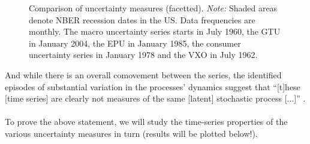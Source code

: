 \documentclass[a4paper,12pt,oneside,pointednumbers,bibtotoc,bigheadings,liststotoc]{scrbook}
\begin{document}
\begin{landscape}
\begin{figure}[!t]
   \centering
   \setlength\fboxsep{0pt}
   \setlength\fboxrule{0pt}
      \caption[Comparison of uncertainty measures (combined).]{Comparison of uncertainty measures (facetted).
      \textit{Note:} Shaded areas denote NBER recession dates in the US. Data frequencies are monthly. The macro uncertainty series starts in July 1960, the GTU in January 2004, the EPU in January 1985, the consumer uncertainty series in January 1978  and the VXO in July 1962.}   \label{fig:comparison_plot_combined}
\end{figure}
\end{landscape}

And while there is an overall comovement between the series, the identified episodes of substantial variation in the processes' dynamics suggest that ``[t]hese [time series] are clearly not measures of the same [latent] stochastic process [...]'' \citep[p. ]{orlikandveldkamp:14}.\\
\\
To prove the above statement, we will study the time-series properties of the various uncertainty measures in turn (results will be plotted below!).
\end{document}
